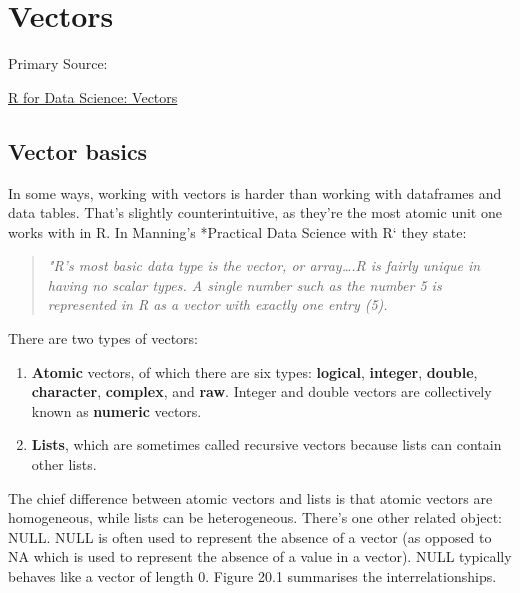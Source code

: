 \documentclass[
]{book}
\begin{document}
\hypertarget{vectors}{%
\chapter{Vectors}\label{vectors}}

Primary Source:

\href{https://r4ds.had.co.nz/vectors.html}{R for Data Science: Vectors}

\hypertarget{vector-basics}{%
\section{Vector basics}\label{vector-basics}}

In some ways, working with vectors is harder than working with dataframes and data tables.
That's slightly counterintuitive, as they're the most atomic unit one works with in R. In Manning's
*Practical Data Science with R` they state:

\begin{quote}
\emph{"R's most basic data type is the vector, or array\ldots.R is fairly unique in having no scalar types. A single number such as the number 5 is represented in R as a vector with exactly one entry (5).}
\end{quote}

There are two types of vectors:

\begin{enumerate}
\def\labelenumi{\arabic{enumi}.}
\item
  \textbf{Atomic} vectors, of which there are six types: \textbf{logical}, \textbf{integer}, \textbf{double}, \textbf{character}, \textbf{complex}, and \textbf{raw}.
  Integer and double vectors are collectively known as \textbf{numeric} vectors.
\item
  \textbf{Lists}, which are sometimes called recursive vectors because lists can contain other lists.
\end{enumerate}

The chief difference between atomic vectors and lists is that atomic vectors are homogeneous, while lists can be heterogeneous. There's one other related object: NULL. NULL is often used to represent the absence of a vector (as opposed to NA which is used to represent the absence of a value in a vector). NULL typically behaves like a vector of length 0. Figure 20.1 summarises the interrelationships.
\end{document}
